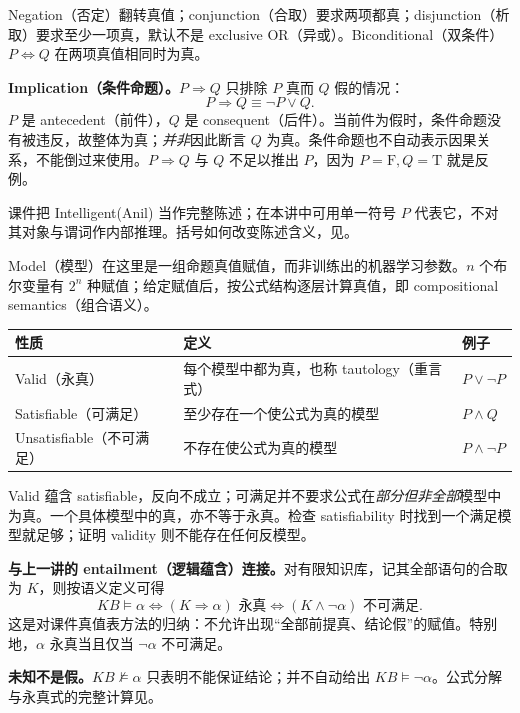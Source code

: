 Negation（否定）翻转真值；conjunction（合取）要求两项都真；disjunction（析取）要求至少一项真，默认不是 exclusive OR（异或）。Biconditional（双条件）$P\Leftrightarrow Q$ 在两项真值相同时为真。

\textbf{Implication（条件命题）。}$P\Rightarrow Q$ 只排除 $P$ 真而 $Q$ 假的情况：
\[
 \boxed{P\Rightarrow Q\equiv\neg P\lor Q}.
\]
$P$ 是 antecedent（前件），$Q$ 是 consequent（后件）。当前件为假时，条件命题没有被违反，故整体为真；\emph{并非}因此断言 $Q$ 为真。条件命题也不自动表示因果关系，不能倒过来使用。$P\Rightarrow Q$ 与 $Q$ 不足以推出 $P$，因为 $P=\mathrm F,Q=\mathrm T$ 就是反例。

课件把 Intelligent(Anil) 当作完整陈述；在本讲中可用单一符号 $P$ 代表它，不对其对象与谓词作内部推理。括号如何改变陈述含义，见。


Model（模型）在这里是一组命题真值赋值，而非训练出的机器学习参数。$n$ 个布尔变量有 $2^n$ 种赋值；给定赋值后，按公式结构逐层计算真值，即 compositional semantics（组合语义）。

\begin{center}
\begin{tabularx}{\textwidth}{@{}lXl@{}}
\toprule
性质 & 定义 & 例子 \\
\midrule
Valid（永真） & 每个模型中都为真，也称 tautology（重言式） & $P\lor\neg P$ \\
Satisfiable（可满足） & 至少存在一个使公式为真的模型 & $P\land Q$ \\
Unsatisfiable（不可满足） & 不存在使公式为真的模型 & $P\land\neg P$ \\
\bottomrule
\end{tabularx}
\end{center}

Valid 蕴含 satisfiable，反向不成立；可满足并不要求公式在\emph{部分但非全部}模型中为真。一个具体模型中的真，亦不等于永真。检查 satisfiability 时找到一个满足模型就足够；证明 validity 则不能存在任何反模型。

\textbf{与上一讲的 entailment（逻辑蕴含）连接。}对有限知识库，记其全部语句的合取为 $K$，则按语义定义可得
\[
 KB\models\alpha
 \iff (K\Rightarrow\alpha)\text{ 永真}
 \iff (K\land\neg\alpha)\text{ 不可满足}.
\]
这是对课件真值表方法的归纳：不允许出现“全部前提真、结论假”的赋值。特别地，$\alpha$ 永真当且仅当 $\neg\alpha$ 不可满足。

\textbf{未知不是假。}$KB\not\models\alpha$ 只表明不能保证结论；并不自动给出 $KB\models\neg\alpha$。公式分解与永真式的完整计算见。

